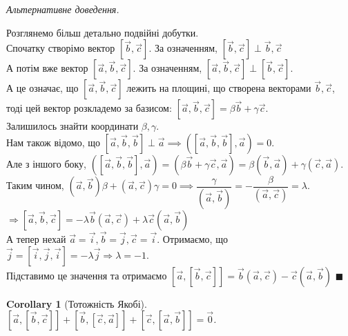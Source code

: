 \documentclass[a4paper, 10pt]{extarticle}
\def\qed{$\blacksquare$}
\def\qed{$\blacksquare$}
\theoremstyle{theoremdd}
\theoremstyle{theoremdd}
\theoremstyle{theoremdd}
\theoremstyle{theoremdd}
\theoremstyle{theoremdd}
\theoremstyle{theoremdd}
\theoremstyle{theoremdd}
\theoremstyle{theoremdd}
\newtheorem{corollary}[theorem]{Corollary}
\begin{document}
\textit{Альтернативне доведення.}
\begin{figure}[H]
\centering
{}
\end{figure}
Розглянемо більш детально подвійні добутки.\\
Спочатку створімо вектор $[\vec{b}, \vec{c}]$. За означенням, $[\vec{b}, \vec{c}] \perp \vec{b},\vec{c}$\\
А потім вже вектор $[\vec{a},\vec{b},\vec{c}]$. За означенням, $[\vec{a},\vec{b},\vec{c}] \perp [\vec{b}, \vec{c}]$.\\
А це означає, що $[\vec{a},\vec{b},\vec{c}]$ лежить на площині, що створена векторами $\vec{b},\vec{c}$, тоді цей вектор розкладемо за базисом: $[\vec{a}, \vec{b}, \vec{c}] = \beta \vec{b} + \gamma \vec{c}$.\\
Залишилось знайти координати $\beta, \gamma$.\\
Нам також відомо, що $[\vec{a},\vec{b},\vec{b}] \perp \vec{a} \implies ([\vec{a}, \vec{b}, \vec{b}], \vec{a}) = 0$.\\
Але з іншого боку, $([\vec{a}, \vec{b}, \vec{b}], \vec{a}) = (\beta \vec{b} + \gamma \vec{c}, \vec{a}) = \beta (\vec{b}, \vec{a}) + \gamma (\vec{c}, \vec{a})$.\\
Таким чином, $(\vec{a}, \vec{b}) \beta + (\vec{a}, \vec{c}) \gamma = 0 \implies \dfrac{\gamma}{(\vec{a}, \vec{b})} = - \dfrac{\beta}{(\vec{a}, \vec{c})} = \lambda$.\\
$\Rightarrow [\vec{a}, \vec{b}, \vec{c}] = -\lambda \vec{b} (\vec{a}, \vec{c}) + \lambda \vec{c} (\vec{a}, \vec{b})$\\
А тепер нехай $\vec{a} = \vec{i}, \vec{b} = \vec{j}, \vec{c} = \vec{i}$. Отримаємо, що\\
$\vec{j} = [\vec{i}, \vec{j}, \vec{i}] = -\lambda \vec{j} \Rightarrow \lambda = -1$.\\
Підставимо це значення та отримаємо $[\vec{a},[\vec{b},\vec{c}]] = \vec{b} (\vec{a}, \vec{c}) - \vec{c} (\vec{a}, \vec{b})$ \qed

\begin{corollary}[Тотожність Якобі]
$[\vec{a}, [\vec{b}, \vec{c}]] + [\vec{b}, [\vec{c}, \vec{a}]] + [\vec{c}, [\vec{a}, \vec{b}]] = \vec{0}$.
\end{corollary}
\end{document}
